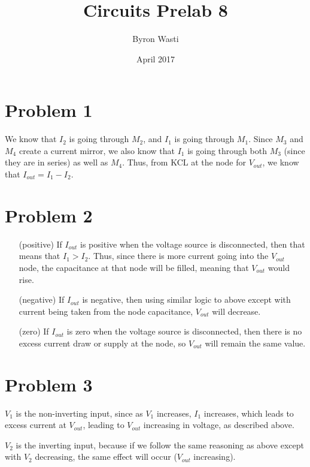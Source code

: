 \documentclass{article}
\title{Circuits Prelab 8}
\author{Byron Wasti}
\date{April 2017}
\begin{document}
\maketitle

    \section{Problem 1}
        We know that $I_2$ is going through $M_2$, and $I_1$ is going through $M_1$. Since $M_3$ and $M_4$ create a current mirror, we also know that $I_1$ is going through both $M_3$ (since they are in series) as well as $M_4$. Thus, from KCL at the node for $V_{out}$, we know that $I_{out} = I_1 - I_2$.

    \section{Problem 2}
        \begin{itemize}
            \item [(positive)] 
                If $I_{out}$ is positive when the voltage source is disconnected, then that means that $I_1 > I_2$. Thus, since there is more current going into the $V_{out}$ node, the capacitance at that node will be filled, meaning that $V_{out}$ would rise.

            \item [(negative)]
                If $I_{out}$ is negative, then using similar logic to above except with current being taken from the node capacitance, $V_{out}$ will decrease.

            \item [(zero)]
                If $I_{out}$ is zero when the voltage source is disconnected, then there is no excess current draw or supply at the node, so $V_{out}$ will remain the same value.

        \end{itemize}

    \section{Problem 3}
        $V_1$ is the non-inverting input, since as $V_1$ increases, $I_1$ increases, which leads to excess current at $V_{out}$, leading to $V_{out}$ increasing in voltage, as described above.

        $V_2$ is the inverting input, because if we follow the same reasoning as above except with $V_2$ decreasing, the same effect will occur ($V_{out}$ increasing). 
\end{document}
